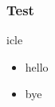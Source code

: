 \begin{frame}
\frametitle{Test}
\begin{block}{icle\cite{wadler1989theorems}}
\begin{itemize}
\item<1-> hello
\item<2-> bye
\end{itemize}
\end{block}
\end{frame}
